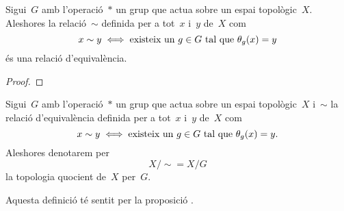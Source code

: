 \documentclass[../topologia.tex]{subfiles}
\begin{document}
    \begin{proposition}
        \label{prop:quocient-dun-espai-per-laccio-dun-grup-relacio}
        Sigui~\(G\) amb l'operació~\(\ast\) un grup que actua sobre un espai topològic~\(X\).
        Aleshores la relació~\(\sim\) definida per a tot~\(x\) i~\(y\) de~\(X\) com
        \[
            x\sim y\iff\text{existeix un }g\in G\text{ tal que }\theta_{g}(x)=y
        \]
        és una relació d'equivalència.
    \end{proposition}
    \begin{proof}
    \end{proof}
    \begin{definition}
        \label{def:quocient-dun-espai-per-laccio-dun-grup}
        Sigui~\(G\) amb l'operació~\(\ast\) un grup que actua sobre un espai topològic~\(X\) i~\(\sim\) la relació d'equivalència definida per a tot~\(x\) i~\(y\) de~\(X\) com
        \[
            x\sim y\iff\text{existeix un }g\in G\text{ tal que }\theta_{g}(x)=y.
        \]
        Aleshores denotarem per
        \[
            X/\sim=X/G
        \]
        la topologia quocient de~\(X\) per~\(G\).

        Aquesta definició té sentit per la proposició .
    \end{definition}
\end{document}
